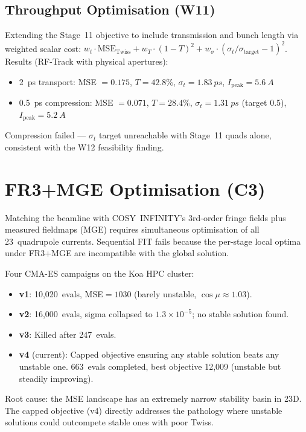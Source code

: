 \documentclass[11pt]{article}
\begin{document}
\subsection{Throughput Optimisation (W11)}

Extending the Stage~11 objective to include transmission and bunch length
via weighted scalar cost:
$w_t \cdot \text{MSE}_\text{Twiss} + w_T \cdot (1-T)^2 + w_\sigma
\cdot (\sigma_t/\sigma_\text{target} - 1)^2$.
Results (RF-Track with physical apertures):
\begin{itemize}[nosep]
  \item 2~ps transport: MSE $= 0.175$, $T = 42.8\%$, $\sigma_t =
    \SI{1.83}{ps}$, $I_\text{peak} = \SI{5.6}{A}$
  \item 0.5~ps compression: MSE $= 0.071$, $T = 28.4\%$, $\sigma_t =
    \SI{1.31}{ps}$ (target 0.5), $I_\text{peak} = \SI{5.2}{A}$
\end{itemize}
Compression failed --- $\sigma_t$ target unreachable with Stage~11 quads
alone, consistent with the W12 feasibility finding.


\section{FR3+MGE Optimisation (C3)}
\label{sec:mge}

Matching the beamline with COSY~INFINITY's 3rd-order fringe fields plus
measured fieldmaps (MGE) requires simultaneous optimisation of all
23~quadrupole currents.  Sequential FIT fails because the per-stage local
optima under FR3+MGE are incompatible with the global solution.

Four CMA-ES campaigns on the Koa HPC cluster:
\begin{itemize}[nosep]
  \item \textbf{v1}: 10,020~evals, MSE$=1030$ (barely unstable,
    $\cos\mu \approx 1.03$).
  \item \textbf{v2}: 16,000~evals, sigma collapsed to $1.3 \times
    10^{-5}$; no stable solution found.
  \item \textbf{v3}: Killed after 247~evals.
  \item \textbf{v4} (current): Capped objective ensuring any stable
    solution beats any unstable one.  663~evals completed, best objective
    12,009 (unstable but steadily improving).
\end{itemize}
Root cause: the MSE landscape has an extremely narrow stability basin in
23D.  The capped objective (v4) directly addresses the pathology where
unstable solutions could outcompete stable ones with poor Twiss.
\end{document}

